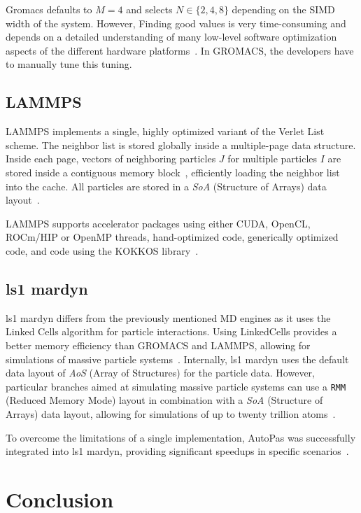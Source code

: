 \documentclass[conference]{IEEEtran}
\begin{document}
Gromacs defaults to $M=4$ and selects $N \in \{2, 4, 8\}$ depending on the SIMD width of the system. However, Finding good values is very time-consuming and depends on a detailed understanding of many low-level software optimization aspects of the different hardware platforms~\cite{PALL20132641}. In GROMACS, the developers have to manually tune this tuning.

\subsection{LAMMPS}

LAMMPS implements a single, highly optimized variant of the Verlet List scheme. The neighbor list is stored globally inside a multiple-page data structure. Inside each page, vectors of neighboring particles $J$ for multiple particles $I$ are stored inside a contiguous memory block~\cite{THOMPSON2022108171}, efficiently loading the neighbor list into the cache.
All particles are stored in a \textit{SoA} (Structure of Arrays) data layout~\cite{THOMPSON2022108171}.

LAMMPS supports accelerator packages using either CUDA, OpenCL, ROCm/HIP or OpenMP threads, hand-optimized
code, generically optimized code, and code using the KOKKOS library~\cite{Seckler2021}.


\subsection{ls1 mardyn}

ls1 mardyn differs from the previously mentioned MD engines as it uses the Linked Cells algorithm for particle interactions. Using LinkedCells provides a better memory efficiency than GROMACS and LAMMPS, allowing for simulations of massive particle systems~\cite{tchipev2019twe}. Internally, ls1 mardyn uses the default data layout of \textit{AoS} (Array of Structures) for the particle data. However, particular branches aimed at simulating massive particle systems can use a \texttt{RMM} (Reduced Memory Mode) layout in combination with a \textit{SoA} (Structure of Arrays) data layout, allowing for simulations of up to twenty trillion atoms~\cite{tchipev2019twe}.

To overcome the limitations of a single implementation, AutoPas was successfully integrated into ls1 mardyn, providing significant speedups in specific scenarios~\cite{SECKLER2021101296}.


\newpage

\section{Conclusion}








\newpage
\newpage
\tableofcontents
\end{document}
